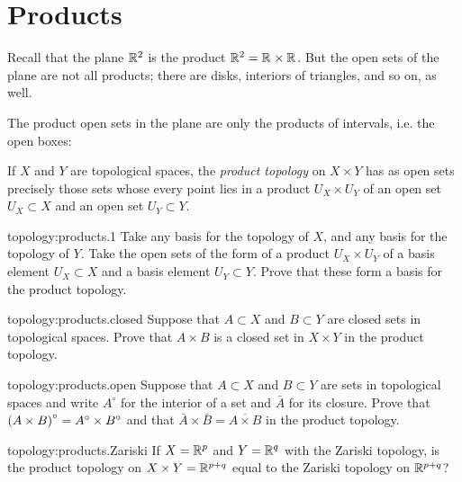 \section{Products}
Recall that the plane \(\mathbb{R}^{2}\) is the product \(\mathbb{R}^{2} = \mathbb{R}^{} \times \mathbb{R}^{}\).
But the open sets of the plane are not all products; there are disks, interiors of triangles, and so on, as well.
\begin{center}

\end{center}
The product open sets in the plane are only the products of intervals, i.e. the open boxes:
\begin{center}

\end{center}
If \(X\) and \(Y\) are topological spaces, the \emph{product topology} on \(X \times Y\) has as open sets precisely those sets whose every point lies in a product \(U_X \times U_Y\) of an open set \(U_X \subset X\) and an open set \(U_Y \subset Y\).
\begin{problem}{topology:products.1}
Take any basis for the topology of \(X\), and any basis for the topology of \(Y\).
Take the open sets of the form of a product \(U_X \times U_Y\) of a basis element \(U_X \subset X\) and a basis element \(U_Y \subset Y\).
Prove that these form a basis for the product topology.
\end{problem}
\begin{problem}{topology:products.closed}
Suppose that \(A \subset X\) and \(B \subset Y\) are closed sets in topological spaces.
Prove that \(A \times B\) is a closed set in \(X \times Y\) in the product topology.
\end{problem}
\begin{problem}{topology:products.open}
Suppose that \(A \subset X\) and \(B \subset Y\) are sets in topological spaces and write \(A^{\circ}\) for the interior of a set and \(\bar{A}\) for its closure.
Prove that \(\left(A \times B\right)^{\circ}=A^{\circ} \times B^{\circ}\) and that \(\bar{A} \times \bar{B}=\overline{A \times B}\) in the product topology.
\end{problem}
\begin{problem}{topology:products.Zariski}
If \(X=\mathbb{R}^{p}\) and \(Y=\mathbb{R}^{q}\) with the Zariski topology, is the product topology on \(X \times Y=\mathbb{R}^{p+q}\) equal to the Zariski topology on \(\mathbb{R}^{p+q}\)?
\end{problem}


